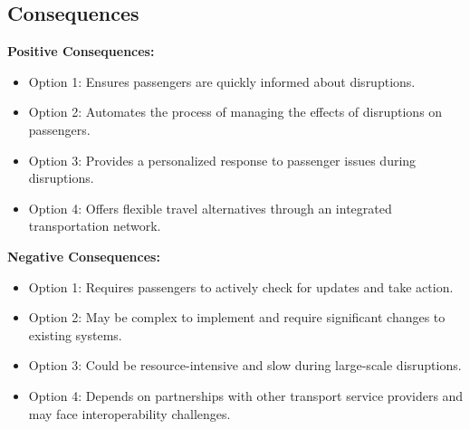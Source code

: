 \subsection*{Consequences}
\textbf{Positive Consequences:}
\begin{itemize}
    \item Option 1: Ensures passengers are quickly informed about disruptions.
    \item Option 2: Automates the process of managing the effects of disruptions on passengers.
    \item Option 3: Provides a personalized response to passenger issues during disruptions.
    \item Option 4: Offers flexible travel alternatives through an integrated transportation network.
\end{itemize}
\textbf{Negative Consequences:}
\begin{itemize}
    \item Option 1: Requires passengers to actively check for updates and take action.
    \item Option 2: May be complex to implement and require significant changes to existing systems.
    \item Option 3: Could be resource-intensive and slow during large-scale disruptions.
    \item Option 4: Depends on partnerships with other transport service providers and may face interoperability challenges.
\end{itemize}
